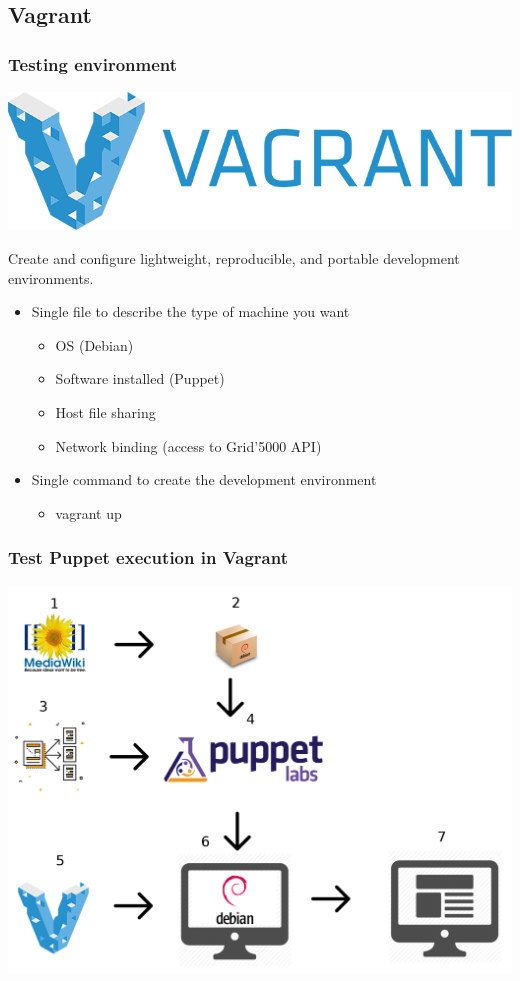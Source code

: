 \documentclass[11pt,compress]{beamer}
\begin{document}
\subsection{Vagrant}
\begin{frame}
\frametitle{Testing environment}
\begin{center}
\includegraphics[scale=0.15]{figures/vagrant}
\end{center}
\begin{block}{}
Create and configure lightweight, reproducible, and portable development environments.
\end{block}
\begin{itemize}
\item Single file to describe the type of machine you want
\begin{itemize}
\item OS (Debian)
\item Software installed (Puppet)
\item Host file sharing
\item Network binding (access to Grid'5000 API)
\end{itemize}
\item Single command to create the development environment
\begin{itemize}
\item vagrant up
\end{itemize}
\end{itemize}
\end{frame}

\begin{frame}
\frametitle{Test Puppet execution in Vagrant}
\includegraphics[scale=0.16]{figures/process}
\end{frame}
\end{document}
